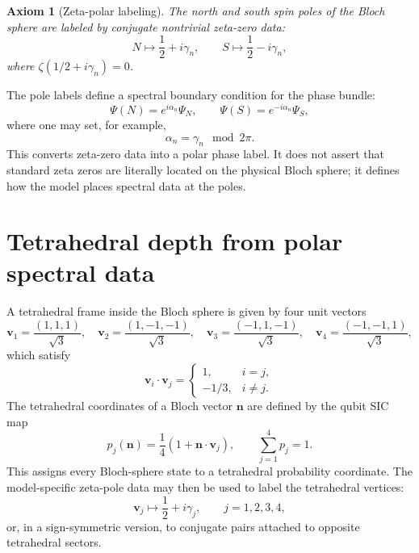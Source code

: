 \documentclass[11pt,a4paper]{article}
\newtheorem{axiom}{Axiom}
\begin{document}
\begin{axiom}[Zeta-polar labeling]
The north and south spin poles of the Bloch sphere are labeled by conjugate nontrivial zeta-zero data:
\begin{equation}
N\mapsto \frac12+i\gamma_n,
\qquad
S\mapsto \frac12-i\gamma_n,
\end{equation}
where $\zeta(1/2+i\gamma_n)=0$.
\end{axiom}

The pole labels define a spectral boundary condition for the phase bundle:
\begin{equation}
\Psi(N)=e^{i\alpha_n}\Psi_N,
\qquad
\Psi(S)=e^{-i\alpha_n}\Psi_S,
\end{equation}
where one may set, for example,
\begin{equation}
\alpha_n=\gamma_n\mod 2\pi.
\end{equation}
This converts zeta-zero data into a polar phase label.  It does not assert that standard zeta zeros are literally located on the physical Bloch sphere; it defines how the model places spectral data at the poles.

\section{Tetrahedral depth from polar spectral data}
A tetrahedral frame inside the Bloch sphere is given by four unit vectors
\begin{equation}
\bm v_1=\frac{(1,1,1)}{\sqrt3},\quad
\bm v_2=\frac{(1,-1,-1)}{\sqrt3},\quad
\bm v_3=\frac{(-1,1,-1)}{\sqrt3},\quad
\bm v_4=\frac{(-1,-1,1)}{\sqrt3},
\end{equation}
which satisfy
\begin{equation}
\boxed{\bm v_i\cdot\bm v_j=\begin{cases}1,&i=j,\\-1/3,&i\neq j.\end{cases}}
\end{equation}
The tetrahedral coordinates of a Bloch vector $\bm n$ are defined by the qubit SIC map
\begin{equation}
\boxed{p_j(\bm n)=\frac14\left(1+\bm n\cdot\bm v_j\right),\qquad \sum_{j=1}^4p_j=1.}
\end{equation}
This assigns every Bloch-sphere state to a tetrahedral probability coordinate.  The model-specific zeta-pole data may then be used to label the tetrahedral vertices:
\begin{equation}
\bm v_j\mapsto \frac12+i\gamma_j,
\qquad j=1,2,3,4,
\end{equation}
or, in a sign-symmetric version, to conjugate pairs attached to opposite tetrahedral sectors.
\end{document}
